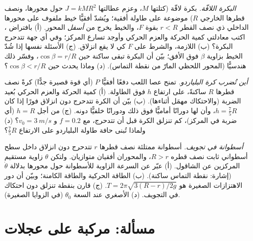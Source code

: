 \begin{exercise}[$\star\star\star$]\label{exo:b2:rigid-body-mechanics:10}
\emph{البكرة اللافّة.} بكرة لافّة (كتلتها $M$، وعزم عطالتها $J = kMR^2$
حول محورها، ونصف قطرها الخارجي $R$) موضوعة على طاولة أفقية؛
ويُشدّ أفقيًّا خيط ملفوف على محورها الداخلي ذي نصف القطر $r < R$
بقوة $F$، والخيط يخرج من \emph{أسفل} المحور. (أ) بافتراض
، اكتب معادلتي كمية الحركة والعزم الحركي
وأوجد تسارع المركز؛ وفي أي جهة تتدحرج البكرة؟ (ب) 
اللازمة، والشرط على $F$ كي لا يقع انزلاق. (ج) الأسئلة نفسها إذا
شُدّ الخيط بزاوية $\beta$ فوق الأفق؛ بيّن أن البكرة تبقى ساكنة حين
$\cos\beta = r/R$، وفسّر ذلك هندسيًّا (المحور اللحظي المارّ من
نقطة التماس). (د) وماذا يحدث حين $\cos\beta < r/R$؟
\end{exercise}

\begin{exercise}[$\star\star\star$]\label{exo:b2:rigid-body-mechanics:11}
\emph{أين تُضرب كرة البلياردو.} تمنح عصا اللعب دفعًا أفقيًّا
$P$ (أي قوة قصيرة جدًّا) كرةً نصف قطرها $R$ ساكنةً، على ارتفاع
$h$ فوق الطاولة. (أ) كمية الحركة والعزم الحركي بُعيد الضربة
(والاحتكاك مهمَل أثناءها). (ب) بيّن أن الكرة تتدحرج دون انزلاق
فورًا إذا كان $h = \tfrac75R$، وأن لها دورانًا أماميًّا فوق ذلك
ودورانًا خلفيًّا دونه. (ج) من أجل $h = R$ (أي ضربة في المركز)، كم
تنزلق الكرة قبل أن تتدحرج، مع $f = 0.2$ و $v_0 = \qty{3}{m/s}$؟
(د) ولماذا تُبنى حافة طاولة البلياردو على الارتفاع $\tfrac75R$؟
\end{exercise}

\begin{exercise}[$\star\star\star$]\label{exo:b2:rigid-body-mechanics:12}
\emph{أسطوانة في تجويف.} أسطوانة ممتلئة نصف قطرها $r$ تتدحرج دون
انزلاق داخل سطح أسطواني ثابت نصف قطره $R > r$، والمحوران أفقيان
متوازيان. ولتكن $\theta$ زاوية مستقيم المركزين عن الشاقول.
(أ) عبّر عن السرعة الزاوية للأسطوانة حول محورها بدلالة
$\dot\theta$ (إشارة: نقطة التماس ساكنة). (ب) الطاقة الحركية
والطاقة الكامنة؛ وبيّن أن دور الاهتزازات الصغيرة هو $T = 2\pi\sqrt{3(R - r)/2g}$.
(ج) قارن بنقطة تنزلق دون احتكاك في التجويف. (د) 
الأصغري  عند السعة $\theta_0$
(في الزوايا الصغيرة).
\end{exercise}

\section{مسألة: مركبة على عجلات}

